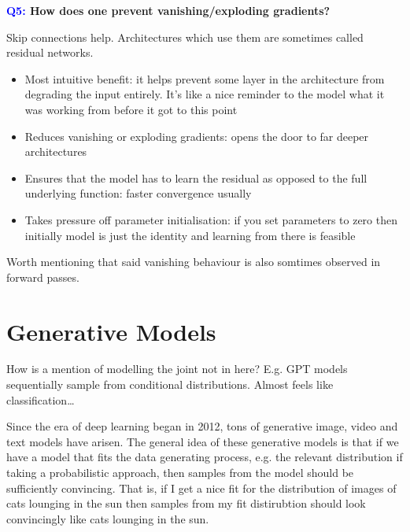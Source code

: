 \documentclass[11pt]{article}
\begin{document}
\begin{center}
    \textbf{\textcolor{blue}{Q5:} How does one prevent vanishing/exploding gradients?}
\end{center}
Skip connections help. Architectures which use them are sometimes called residual networks.
\begin{itemize}
    \item Most intuitive benefit: it helps prevent some layer in the architecture from degrading the input entirely. It's like a nice reminder to the model what it was working from before it got to this point
    \item Reduces vanishing or exploding gradients: opens the door to far deeper architectures
    \item Ensures that the model has to learn the residual as opposed to the full underlying function: faster convergence usually
    \item Takes pressure off parameter initialisation: if you set parameters to zero then initially model is just the identity and learning from there is feasible
\end{itemize}

Worth mentioning that said vanishing behaviour is also somtimes observed in forward passes.

\section{Generative Models}

How is a mention of modelling the joint not in here? E.g. GPT models sequentially sample from conditional distributions. Almost feels like classification\dots

 Since the era of deep learning began in 2012, tons of generative image, video and text models have arisen. The general idea of these generative models is that if we have a model that fits the data generating process, e.g. the relevant distribution if taking a probabilistic approach, then samples from the model should be sufficiently convincing. That is, if I get a nice fit for the distribution of images of cats lounging in the sun then samples from my fit distirubtion should look convincingly like cats lounging in the sun.
\end{document}

